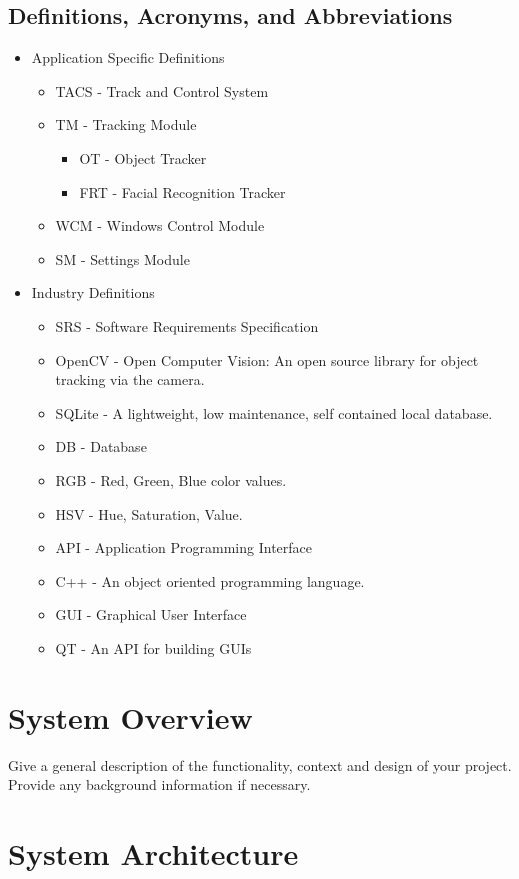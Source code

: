 \documentclass[titlepage]{article}
\begin{document}
\subsection{Definitions, Acronyms, and Abbreviations}
\begin{itemize}
	\item Application Specific Definitions
	\begin{itemize}
		\item TACS - Track and Control System
		\item TM - Tracking Module
		\begin{itemize}
			\item OT - Object Tracker
			\item FRT - Facial Recognition Tracker
		\end{itemize}
		\item WCM - Windows Control Module
		\item SM - Settings Module
	\end{itemize}
	\item Industry Definitions
	\begin{itemize}
		\item SRS - Software Requirements Specification
		\item OpenCV - Open Computer Vision: An open source library for object tracking via the camera.
		\item SQLite - A lightweight, low maintenance, self contained local database.
		\item DB - Database
		\item RGB - Red, Green, Blue color values.
		\item HSV - Hue, Saturation, Value.
		\item API - Application Programming Interface
		\item C++ - An object oriented programming language.
		\item GUI - Graphical User Interface
		\item QT - An API for building GUIs
	\end{itemize}
\end{itemize}

\section{System Overview}
Give a general description of the functionality, context and design of your project. Provide any background information if necessary.

\section{System Architecture}
\end{document}
